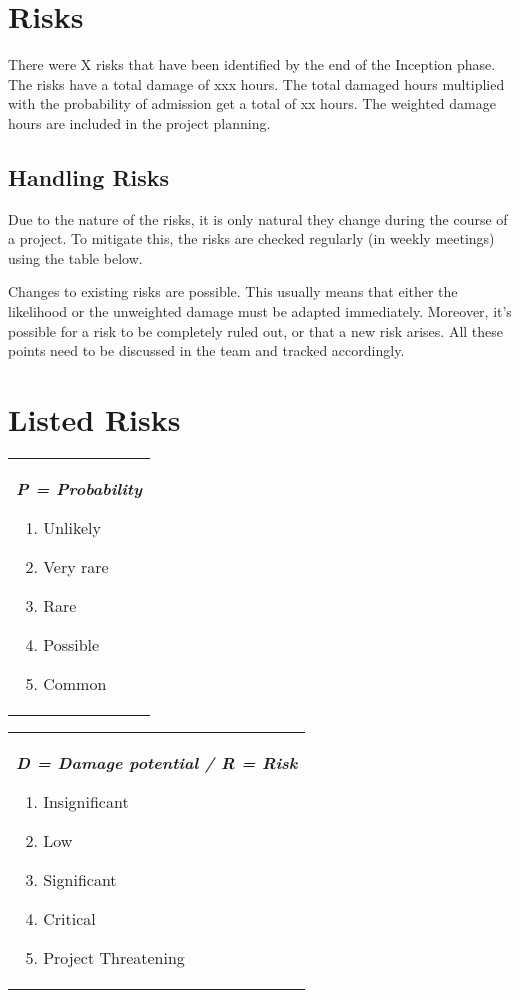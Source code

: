 \section{Risks}
There were X risks that have been identified by the end of the Inception phase.
The risks have a total damage of xxx hours. The total damaged hours multiplied
with the probability of admission get a total of xx hours. The weighted damage
hours are included in the project planning.

\subsection{Handling Risks}
Due to the nature of the risks, it is only natural they change during the course of a project.
To mitigate this, the risks are checked regularly (in weekly meetings) using the table below.

Changes to existing risks are possible. This usually means that either the likelihood or
the unweighted damage must be adapted immediately. Moreover, it's possible for a risk to
be completely ruled out, or that a new risk arises. All these points need to be discussed in
the team and tracked accordingly.

\section{Listed Risks}
\begin{tabular}[t]{@{}>{\raggedright}p{}}
  \textbf{\textit{P = Probability}}
  \begin{enumerate}[topsep=0pt,itemsep=-2pt,leftmargin=13pt]
  \item Unlikely
  \item Very rare
  \item Rare
  \item Possible
  \item Common
  \end{enumerate}
\end{tabular}
\begin{tabular}[t]{@{}>{\raggedright}p{}@{}}
  \textbf{\textit{D = Damage potential  / R = Risk}}
  \begin{enumerate}[topsep=0pt,itemsep=-2pt,leftmargin=13pt]
  \item Insignificant
  \item Low
  \item Significant
  \item Critical
  \item Project Threatening
  \end{enumerate}
\end{tabular}

